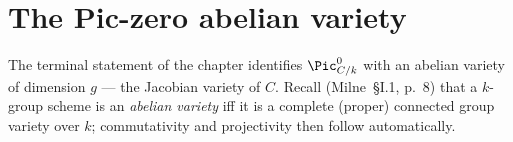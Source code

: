 \section{The Pic-zero abelian variety}
\label{sec:pic0_abelian_variety}

The terminal statement of the chapter identifies \(\Pic^0_{C/k}\) with
an abelian variety of dimension \(g\) --- the Jacobian variety of \(C\).
Recall (Milne~\S I.1, p.~8) that a \(k\)-group scheme is an
\emph{abelian variety} iff it is a complete (proper) connected group
variety over \(k\); commutativity and projectivity then follow
automatically.


